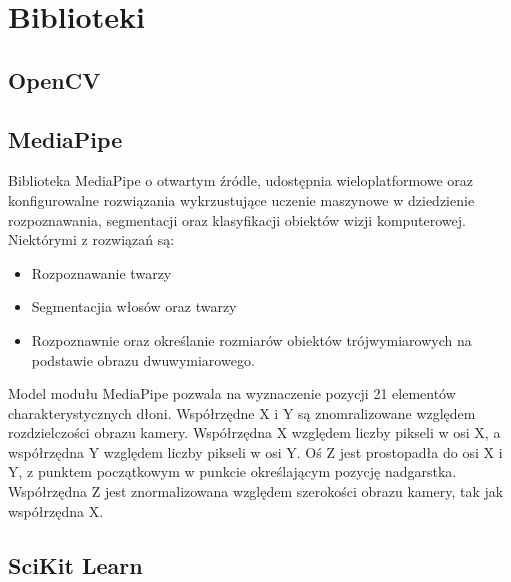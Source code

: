 

\section{Biblioteki}

\subsection{OpenCV}

\subsection{MediaPipe}

\quad Biblioteka MediaPipe o otwartym źródle, udostępnia wieloplatformowe oraz konfigurowalne rozwiązania wykrzustujące uczenie maszynowe w dziedzienie rozpoznawania, segmentacji oraz klasyfikacji obiektów wizji komputerowej. Niektórymi z rozwiązań są:

\begin{itemize}
    \item Rozpoznawanie twarzy
    \item Segmentacjia włosów oraz twarzy
    \item Rozpoznawnie oraz określanie rozmiarów obiektów trójwymiarowych 
            na podstawie obrazu dwuwymiarowego. 
\end{itemize}

\quad Model modułu MediaPipe pozwala na wyznaczenie pozycji 21 elementów charakterystycznych dłoni. Współrzędne X i Y są znomralizowane względem rozdzielczości obrazu kamery. Współrzędna X względem liczby pikseli w osi X, a współrzędna Y względem liczby pikseli w osi Y. Oś Z jest prostopadła do osi X i Y, z punktem początkowym w punkcie określającym pozycję nadgarstka. Współrzędna Z jest znormalizowana względem szerokości obrazu kamery, tak jak współrzędna X. 

\subsection{SciKit Learn}

